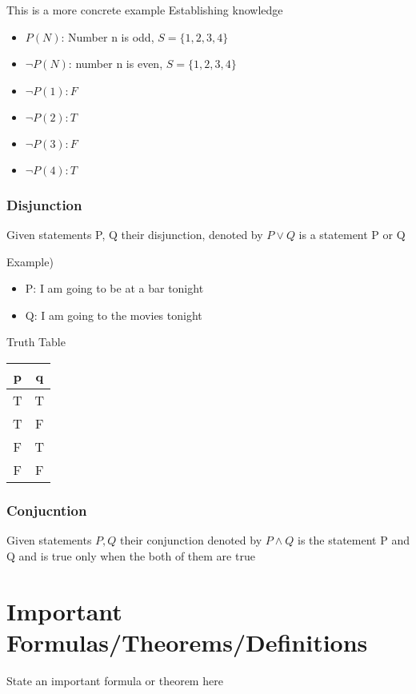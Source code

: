 \documentclass[12pt,a4paper]{article}
\begin{document}
This is a more concrete example 
\vspace{8pt}
Establishing knowledge 
\begin{itemize}
  \item \( P(N) \): Number n is odd, \( S = \{1,2,3,4\}   \)
  \item \( \neg P(N) \): number n is even, \( S = \{1,2,3,4\}   \)
\end{itemize}

\begin{itemize}
  \item  \( \neg P(1): F \)
  \item  \( \neg P(2): T \)
  \item  \( \neg P(3): F \)
  \item  \( \neg P(4): T \)
\end{itemize}

\subsubsection{Disjunction}
Given statements P, Q their disjunction, denoted by \( P \lor Q \) is a statement P or Q

Example)
\vspace{12pt}
\begin{itemize}
  \item P: I am going to be at a bar tonight 
  \item Q: I am going to the movies tonight 
\end{itemize}

\vspace{12pt}

Truth Table 

\begin{tabular}{|c|c|}
\hline
p & q \\
\hline
T & T \\
T & F \\
F & T \\
F & F \\
\hline
\end{tabular}

\subsubsection{Conjucntion}
Given statements \( P,Q \) their conjunction denoted by \( P \land Q\) is the statement P and Q and is true only when the both of them are true 

\section{Important Formulas/Theorems/Definitions}
\begin{tcolorbox}[colback=blue!5!white,colframe=blue!75!black,title=Key Formula/Theorem]
  State an important formula or theorem here
\end{tcolorbox}
\end{document}
